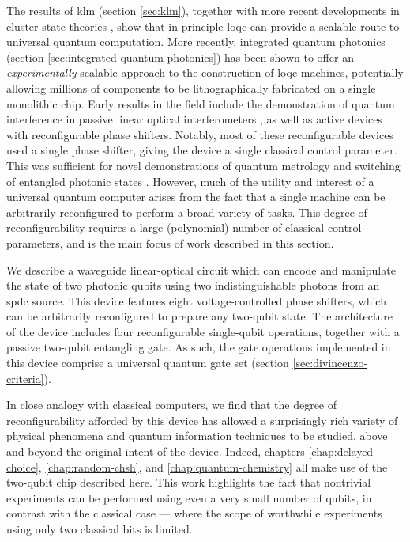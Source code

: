 The results of \acrshort{klm} (section \ref{sec:klm}), together with more recent developments in cluster-state theories \cite{Raussendorf2001, Raussendorf2003, Briegel2001, Browne2005}, show that in principle \acrshort{loqc} can provide a scalable route to universal quantum computation. More recently, integrated quantum photonics (section \ref{sec:integrated-quantum-photonics}) has been shown to offer an \emph{experimentally} scalable approach to the construction of \acrshort{loqc} machines, potentially allowing millions  \cite{Sun2013} of components to be lithographically fabricated on a single monolithic chip. Early results in the field include the demonstration of quantum interference in passive linear optical interferometers \cite{Politi2009, Laing2010, Marshall2009, Peruzzo2011a}, as well as active devices with reconfigurable phase shifters\cite{Matthews2009, Matthews2011a, Bonneau2012b}. Notably, most of these reconfigurable devices used a single phase shifter, giving the device a single classical control parameter. This was sufficient for novel demonstrations of quantum metrology \cite{Matthews2009} and switching of entangled photonic states \cite{Bonneau2012b}. However, much of the utility and interest of a universal quantum computer arises from the fact that a single machine can be arbitrarily reconfigured to perform a broad variety of tasks. This degree of reconfigurability requires a large (polynomial) number of classical control parameters, and is the main focus of work described in this section.

We describe a waveguide linear-optical circuit which can encode and manipulate the state of two photonic qubits using two indistinguishable photons from an \acrshort{spdc} source. This device features eight voltage-controlled phase shifters, which can be arbitrarily reconfigured to prepare any two-qubit state. The architecture of the device includes four reconfigurable single-qubit operations, together with a passive two-qubit entangling gate. As such, the gate operations implemented in this device comprise a universal quantum gate set (section \ref{sec:divincenzo-criteria}). 

In close analogy with classical computers, we find that the degree of reconfigurability afforded by this device has allowed a surprisingly rich variety of physical phenomena and quantum information techniques to be studied, above and beyond the original intent of the device. Indeed, chapters \ref{chap:delayed-choice}, \ref{chap:random-chsh}, and \ref{chap:quantum-chemistry} all make use of the two-qubit chip described here. This work highlights the fact that nontrivial experiments can be performed using even a very small number of qubits, in contrast with the classical case --- where the scope of worthwhile experiments using only two classical bits is limited.

